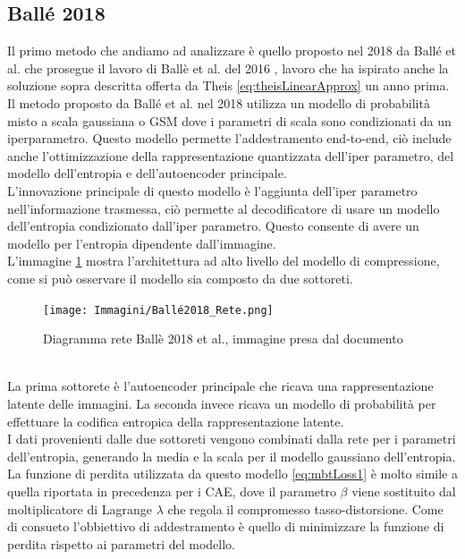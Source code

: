 \subsection{Ballé 2018}
Il primo metodo che andiamo ad analizzare è quello proposto nel 2018 da Ballé et al. \cite{minnen2018joint} che prosegue il lavoro di Ballè et al. del 2016 \cite{balle2018variational}, lavoro che ha ispirato anche la soluzione sopra descritta offerta da Theis \ref{eq:theisLinearApprox} un anno prima.\\
Il metodo proposto da Ballé et al. nel 2018 utilizza un modello di probabilità misto a scala gaussiana o GSM dove i parametri di scala sono condizionati da un iperparametro. Questo modello permette l’addestramento end-to-end, ciò include anche l’ottimizzazione della rappresentazione quantizzata dell’iper parametro, del modello dell’entropia e dell’autoencoder principale.\\
L’innovazione principale di questo modello è l’aggiunta dell’iper parametro nell’informazione trasmessa, ciò permette al decodificatore di usare un modello dell’entropia condizionato dall’iper parametro. Questo consente di avere un modello per l’entropia dipendente dall’immagine.\\
L’immagine \ref{fig:balle2018Network} mostra l’architettura ad alto livello del modello di compressione, come si può osservare il modello sia composto da due sottoreti.
\begin{figure}[!h]
    \centering
    \texttt{[image: Immagini/Ballé2018\_Rete.png]}
    \caption{Diagramma rete Ballè 2018 et al., immagine presa dal documento \cite{minnen2018joint}}
    \label{fig:balle2018Network}
\end{figure}\\
La prima sottorete è l’autoencoder principale che ricava una rappresentazione latente delle immagini. La seconda invece ricava un modello di probabilità per effettuare la codifica entropica della rappresentazione latente.\\
I dati provenienti dalle due sottoreti vengono combinati dalla rete per i parametri dell’entropia, generando la media e la scala per il modello gaussiano dell’entropia.\\
La funzione di perdita utilizzata da questo modello \ref{eq:mbtLoss1} è molto simile a quella riportata in precedenza per i CAE, dove il parametro $\beta$ viene sostituito dal moltiplicatore di Lagrange $\lambda$ che regola il compromesso tasso-distorsione. Come di consueto l’obbiettivo di addestramento è quello di minimizzare la funzione di perdita rispetto ai parametri del modello.\\
